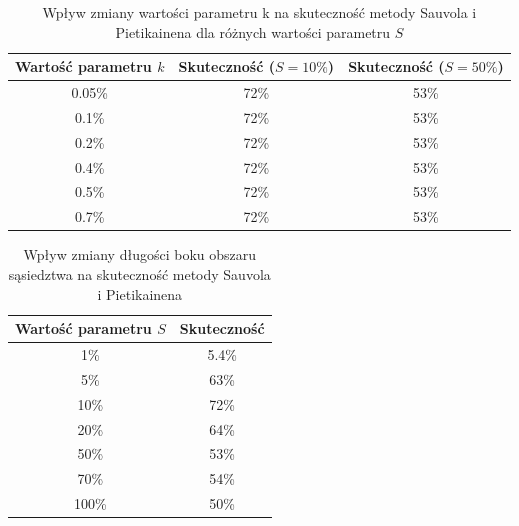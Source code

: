 \begin {table}
  \begin{center}
    \begin{tabular}{c | c | c}
      Wartość parametru $k$ & Skuteczność ($S = 10\%$) & Skuteczność ($S = 50\%$)  \\
      \hline
      0.05\% & 72\% & 53\% \\
      0.1\% & 72\% & 53\% \\
      0.2\% & 72\% & 53\% \\
      0.4\% & 72\% & 53\% \\
      0.5\% & 72\% & 53\% \\
      0.7\% & 72\% & 53\%
    \end{tabular}
    \caption {Wpływ zmiany wartości parametru k na skuteczność metody Sauvola i Pietikainena dla różnych wartości parametru $S$}
    \label{tab:sauvol_pietikainen_parametr_k} 
  \end{center}
\end {table}

\begin {table}
  \begin{center}
    \begin{tabular}{c | c}
      Wartość parametru $S$ & Skuteczność \\
      \hline
      1\% & 5.4\% \\
      5\% & 63\% \\
      10\% & 72\% \\
      20\% & 64\% \\
      50\% & 53\% \\
      70\% & 54\% \\
      100\% & 50\%
    \end{tabular}
    \caption {Wpływ zmiany długości boku obszaru sąsiedztwa na skuteczność metody Sauvola i Pietikainena}
    \label{tab:sauvol_pietikainen_dlugosc_boku} 
  \end{center}
\end {table}

